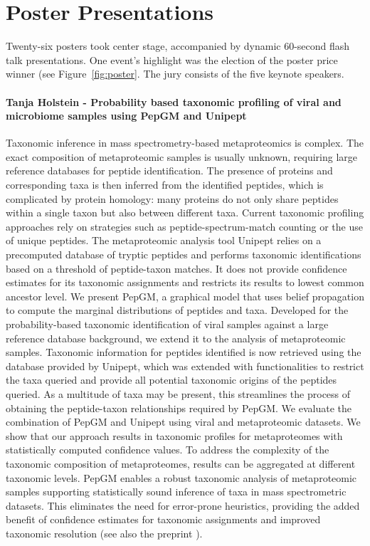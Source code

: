 \section{Poster Presentations}

Twenty-six posters took center stage, accompanied by dynamic 60-second flash talk presentations. One event's highlight was the election of the poster price winner (see Figure~\ref{fig:poster}. The jury consists of the five keynote speakers.

\paragraph{Tanja Holstein - Probability based taxonomic profiling of viral and microbiome samples using PepGM and Unipept}

Taxonomic inference in mass spectrometry-based metaproteomics is complex. The exact composition of metaproteomic samples is usually unknown, requiring large reference databases for peptide identification. The presence of proteins and corresponding taxa is then inferred from the identified peptides, which is complicated by protein homology: many proteins do not only share peptides within a single taxon but also between different taxa. Current taxonomic profiling approaches rely on strategies such as peptide-spectrum-match counting or the use of unique peptides. The metaproteomic analysis tool Unipept relies on a precomputed database of tryptic peptides and performs taxonomic identifications based on a threshold of peptide-taxon matches. It does not provide confidence estimates for its taxonomic assignments and restricts its results to lowest common ancestor level.
We present PepGM, a graphical model that uses belief propagation to compute the marginal distributions of peptides and taxa. Developed for the probability-based taxonomic identification of viral samples against a large reference database background, we extend it to the analysis of metaproteomic samples. Taxonomic information for peptides identified is now retrieved using the database provided by Unipept, which was extended with functionalities to restrict the taxa queried and provide all potential taxonomic origins of the peptides queried. As a multitude of taxa may be present, this streamlines the process of obtaining the peptide-taxon relationships required by PepGM.
We evaluate the combination of PepGM and Unipept using viral and metaproteomic datasets. We show that our approach results in taxonomic profiles for metaproteomes with statistically computed confidence values. To address the complexity of the taxonomic composition of metaproteomes, results can be aggregated at different taxonomic levels. PepGM enables a robust taxonomic analysis of metaproteomic samples supporting statistically sound inference of taxa in mass spectrometric datasets. This eliminates the need for error-prone heuristics, providing the added benefit of confidence estimates for taxonomic assignments and improved taxonomic resolution (see also the preprint \citep{Holstein2024}).

